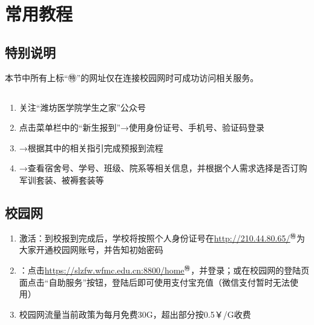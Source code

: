 \chapter[常用教程]{常用教程}

\section*{特别说明}
本节中所有上标“㊕”的网址仅在连接校园网时可成功访问相关服务。

\section[新生信息查询]{}
\label{freshman_query}
\begin{enumerate}
      \item 关注“潍坊医学院学生之家”公众号
      \item 点击菜单栏中的“新生报到”→使用身份证号、手机号、验证码登录
      \item →根据其中的相关指引完成预报到流程
      \item →查看宿舍号、学号、班级、院系等相关信息，并根据个人需求选择是否订购军训套装、被褥套装\footnotemark 等
\end{enumerate}

\section[校园网]{校园网}
\label{wifi_register}
\begin{enumerate}
      \item 激活：到校报到完成后，学校将按照个人身份证号在\uline{\href{http://210.44.80.65/}{http://210.44.80.65/}$^㊕$}为大家开通校园网账号，并告知初始密码\footnotemark
      \item \textbf{}：点击\uline{\href{https://slzfw.wfmc.edu.cn:8800/home/}{https://slzfw.wfmc.edu.cn:8800/home}$^㊕$}，并登录；或在校园网的登陆页面点击“自助服务”按钮\footnotemark，登陆后即可使用支付宝充值（微信支付暂时无法使用）
      \item 校园网流量当前政策为每月免费30G，超出部分按0.5\textsf{￥}/G收费
\end{enumerate}

